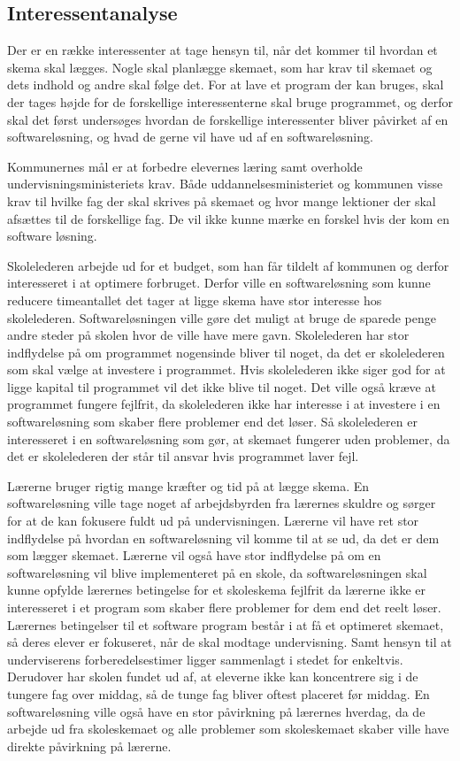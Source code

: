 \subsection{Interessentanalyse}
Der er en række interessenter at tage hensyn til, når det kommer til hvordan et skema skal lægges. Nogle skal planlægge skemaet, som har krav til skemaet og dets indhold og andre skal følge det. For at lave et program der kan bruges, skal der tages højde for de forskellige interessenterne skal bruge programmet, og derfor skal det først undersøges hvordan de forskellige interessenter bliver påvirket af en softwareløsning, og hvad de gerne vil have ud af en softwareløsning. 

Kommunernes mål er at forbedre elevernes læring samt overholde undervisningsministeriets krav. Både uddannelsesministeriet og kommunen visse krav til hvilke fag der skal skrives på skemaet og hvor mange lektioner der skal afsættes til de forskellige fag. De vil ikke kunne mærke en forskel hvis der kom en software løsning.

Skolelederen arbejde ud for et budget, som han får tildelt af kommunen og derfor interesseret i at optimere forbruget. Derfor ville en softwareløsning som kunne reducere timeantallet det tager at ligge skema have stor interesse hos skolelederen. Softwareløsningen ville gøre det muligt at bruge de sparede penge andre steder på skolen hvor de ville have mere gavn. Skolelederen har stor indflydelse på om programmet nogensinde bliver til noget, da det er skolelederen som skal vælge at investere i programmet. Hvis skolelederen ikke siger god for at ligge kapital til programmet vil det ikke blive til noget. Det ville også kræve at programmet fungere fejlfrit, da skolelederen ikke har interesse i at investere i en softwareløsning som skaber flere problemer end det løser. Så skolelederen er interesseret i en softwareløsning som gør, at skemaet fungerer uden problemer, da det er skolelederen der står til ansvar hvis programmet laver fejl. 

Lærerne bruger rigtig mange kræfter og tid på at lægge skema. En softwareløsning ville tage noget af arbejdsbyrden fra lærernes skuldre og sørger for at de kan fokusere fuldt ud på undervisningen. Lærerne vil have ret stor indflydelse på hvordan en softwareløsning vil komme til at se ud, da det er dem som lægger skemaet. Lærerne vil også have stor indflydelse på om en softwareløsning vil blive implementeret på en skole, da softwareløsningen skal kunne opfylde lærernes betingelse for et skoleskema fejlfrit da lærerne ikke er interesseret i et program som skaber flere problemer for dem end det reelt løser. Lærernes betingelser til et software program består i at få et optimeret skemaet, så deres elever er fokuseret, når de skal modtage undervisning. Samt hensyn til at underviserens forberedelsestimer ligger sammenlagt i stedet for enkeltvis. Derudover har skolen fundet ud af, at eleverne ikke kan koncentrere sig i de tungere fag over middag, så de tunge fag bliver oftest placeret før middag. En softwareløsning ville også have en stor påvirkning på lærernes hverdag, da de arbejde ud fra skoleskemaet og alle problemer som skoleskemaet skaber ville have direkte påvirkning på lærerne. 

